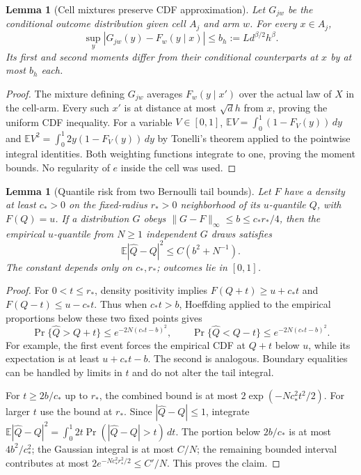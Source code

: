 \documentclass[11pt]{article}
\newtheorem{lemma}[theorem]{Lemma}
\theoremstyle{remark}
\newcommand{\E}{\mathbb E}
\begin{document}
\begin{lemma}[Cell mixtures preserve CDF approximation]\label{mixture}
Let $G_{jw}$ be the conditional outcome distribution given cell $A_j$ and arm $w$. For every $x\in A_j$,
\[
 \sup_y|G_{jw}(y)-F_w(y\mid x)|\leq b_h:=Ld^{\beta/2}h^\beta.
\]
Its first and second moments differ from their conditional counterparts at $x$ by at most $b_h$ each.
\end{lemma}
\begin{proof}
The mixture defining $G_{jw}$ averages $F_w(y\mid x')$ over the actual law of $X$ in the cell-arm. Every such $x'$ is at distance at most $\sqrt d h$ from $x$, proving the uniform CDF inequality. For a variable $V\in[0,1]$,
$\E V=\int_0^1(1-F_V(y))\,dy$ and
$\E V^2=\int_0^1 2y(1-F_V(y))\,dy$ by Tonelli's theorem applied to the pointwise integral identities. Both weighting functions integrate to one, proving the moment bounds. No regularity of $e$ inside the cell was used.
\end{proof}

\begin{lemma}[Quantile risk from two Bernoulli tail bounds]\label{quantile}
Let $F$ have a density at least $c_*>0$ on the fixed-radius $r_*>0$ neighborhood of its $u$-quantile $Q$, with $F(Q)=u$. If a distribution $G$ obeys $\|G-F\|_\infty\leq b\leq c_*r_*/4$, then the empirical $u$-quantile from $N\geq1$ independent $G$ draws satisfies
\[
                   \E|\widehat Q-Q|^2\leq C(b^2+N^{-1}).
\]
The constant depends only on $c_*,r_*$; outcomes lie in $[0,1]$.
\end{lemma}
\begin{proof}
For $0<t\leq r_*$, density positivity implies
$F(Q+t)\geq u+c_*t$ and $F(Q-t)\leq u-c_*t$. Thus when $c_*t>b$, Hoeffding applied to the empirical proportions below these two fixed points gives
\[
 \Pr\{\widehat Q>Q+t\}\leq e^{-2N(c_*t-b)^2},\qquad
 \Pr\{\widehat Q<Q-t\}\leq e^{-2N(c_*t-b)^2}.
\]
For example, the first event forces the empirical CDF at $Q+t$ below $u$, while its expectation is at least $u+c_*t-b$. The second is analogous. Boundary equalities can be handled by limits in $t$ and do not alter the tail integral.

For $t\geq2b/c_*$ up to $r_*$, the combined bound is at most $2\exp(-Nc_*^2t^2/2)$. For larger $t$ use the bound at $r_*$. Since $|\widehat Q-Q|\leq1$, integrate
$\E|\widehat Q-Q|^2=\int_0^1 2t\Pr(|\widehat Q-Q|>t)\,dt$.
The portion below $2b/c_*$ is at most $4b^2/c_*^2$; the Gaussian integral is at most $C/N$; the remaining bounded interval contributes at most $2e^{-Nc_*^2r_*^2/2}\leq C'/N$. This proves the claim.
\end{proof}
\end{document}
